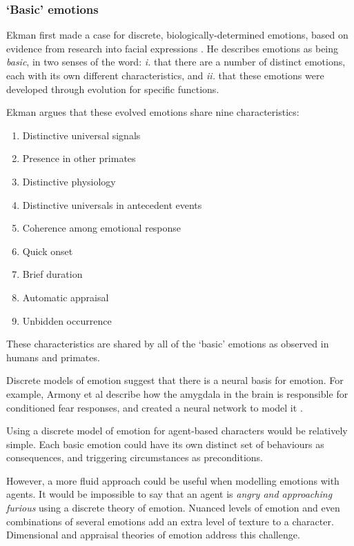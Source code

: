 \documentclass[11pt]{report}
\begin{document}
\subsubsection{`Basic' emotions}
Ekman first made a case for discrete, biologically-determined emotions, based on evidence from research into facial expressions \citep{ekman1992argument}. He describes emotions as being \emph{basic}, in two senses of the word: \emph{i.} that there are a number of distinct emotions, each with its own different characteristics, and \emph{ii.} that these emotions were developed through evolution for specific functions.

Ekman argues that these evolved emotions share nine characteristics:

\begin{enumerate}
  \item Distinctive universal signals
  \item Presence in other primates
  \item Distinctive physiology
  \item Distinctive universals in antecedent events
  \item Coherence among emotional response
  \item Quick onset
  \item Brief duration
  \item Automatic appraisal
  \item Unbidden occurrence
\end{enumerate}

These characteristics are shared by all of the `basic' emotions as observed in humans and primates.

Discrete models of emotion suggest that there is a neural basis for emotion. For example, Armony et al describe how the amygdala in the brain is responsible for conditioned fear responses, and created a neural network to model it \citep{armony1997computational}.

Using a discrete model of emotion for agent-based characters would be relatively simple. Each basic emotion could have its own distinct set of behaviours as consequences, and triggering circumstances as preconditions.

However, a more fluid approach could be useful when modelling emotions with agents. It would be impossible to say that an agent is \emph{angry and approaching furious} using a discrete theory of emotion. Nuanced levels of emotion and even combinations of several emotions add an extra level of texture to a character. Dimensional and appraisal theories of emotion address this challenge.
\end{document}
